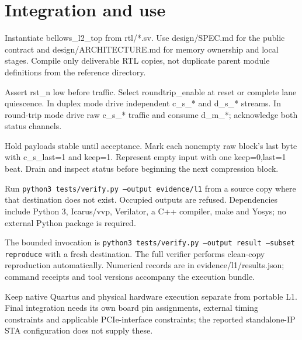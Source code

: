\documentclass[11pt,a4paper]{article}
\begin{document}
\section{Integration and use}

Instantiate bellows\_\allowbreak{}l2\_\allowbreak{}top from rtl/\allowbreak{}*\allowbreak{}.sv. Use design/\allowbreak{}SPEC.md for the public contract and design/\allowbreak{}ARCHITECTURE.md for memory ownership and local stages. Compile only deliverable RTL copies,\allowbreak{} not duplicate parent module definitions from the reference directory.


Assert rst\_\allowbreak{}n low before traffic. Select roundtrip\_\allowbreak{}enable at reset or complete lane quiescence. In duplex mode drive independent c\_\allowbreak{}s\_\allowbreak{}*\allowbreak{} and d\_\allowbreak{}s\_\allowbreak{}*\allowbreak{} streams. In round-trip mode drive raw c\_\allowbreak{}s\_\allowbreak{}*\allowbreak{} traffic and consume d\_\allowbreak{}m\_\allowbreak{}*\allowbreak{}; acknowledge both status channels.


Hold payloads stable until acceptance. Mark each nonempty raw block's last byte with c\_\allowbreak{}s\_\allowbreak{}last=\allowbreak{}1 and keep=\allowbreak{}1. Represent empty input with one keep=\allowbreak{}0,\allowbreak{}last=\allowbreak{}1 beat. Drain and inspect status before beginning the next compression block.


Run \texttt{python3 tests/\allowbreak{}verify.py --output evidence/\allowbreak{}l1} from a source copy where that destination does not exist. Occupied outputs are refused. Dependencies include Python 3,\allowbreak{} Icarus/\allowbreak{}vvp,\allowbreak{} Verilator,\allowbreak{} a C+\allowbreak{}+\allowbreak{} compiler,\allowbreak{} make and Yosys; no external Python package is required.


The bounded invocation is \texttt{python3 tests/\allowbreak{}verify.py --output result --subset reproduce} with a fresh destination. The full verifier performs clean-copy reproduction automatically. Numerical records are in evidence/\allowbreak{}l1/\allowbreak{}results.json; command receipts and tool versions accompany the execution bundle.


Keep native Quartus and physical hardware execution separate from portable L1. Final integration needs its own board pin assignments,\allowbreak{} external timing constraints and applicable PCIe-interface constraints; the reported standalone-IP STA configuration does not supply these.
\end{document}

